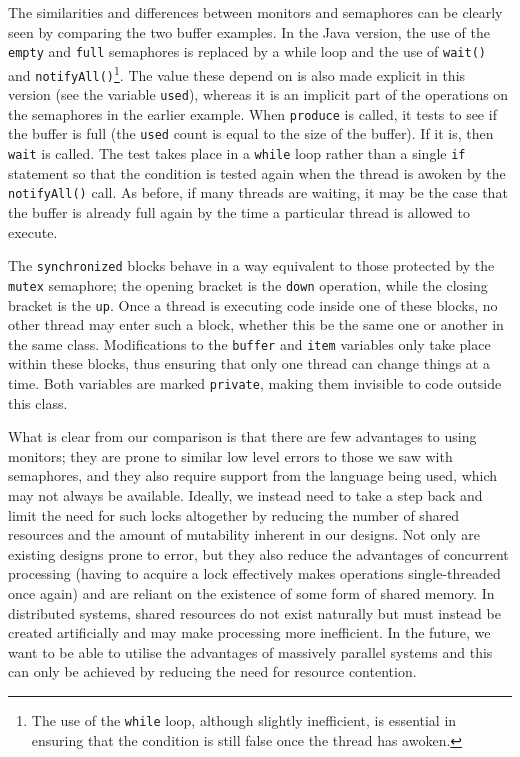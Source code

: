 The similarities and differences between monitors and semaphores can
be clearly seen by comparing the two buffer examples.  In the Java
version, the use of the \texttt{empty} and \texttt{full} semaphores is
replaced by a while loop and the use of \texttt{wait()} and
\texttt{notifyAll()}\footnote{The use of the \texttt{while} loop,
although slightly inefficient, is essential in ensuring that the
condition is still false once the thread has awoken.}.  The value
these depend on is also made explicit in this version (see the
variable \texttt{used}), whereas it is an implicit part of the
operations on the semaphores in the earlier example.  When
\texttt{produce} is called, it tests to see if the buffer is full (the
\texttt{used} count is equal to the size of the buffer).  If it is,
then \texttt{wait} is called.  The test takes place in a
\texttt{while} loop rather than a single \texttt{if} statement so that
the condition is tested again when the thread is awoken by the
\texttt{notifyAll()} call.  As before, if many threads are waiting, it
may be the case that the buffer is already full again by the time a
particular thread is allowed to execute.

The \texttt{synchronized} blocks behave in a way equivalent to those
protected by the \texttt{mutex} semaphore; the opening bracket is the
\texttt{down} operation, while the closing bracket is the \texttt{up}.
Once a thread is executing code inside one of these blocks, no other
thread may enter such a block, whether this be the same one or another
in the same class.  Modifications to the \texttt{buffer} and
\texttt{item} variables only take place within these blocks, thus
ensuring that only one thread can change things at a time.  Both
variables are marked \texttt{private}, making them invisible to code
outside this class.

What is clear from our comparison is that there are few advantages to
using monitors; they are prone to similar low level errors to those we
saw with semaphores, and they also require support from the language
being used, which may not always be available.  Ideally, we instead
need to take a step back and limit the need for such locks altogether
by reducing the number of shared resources and the amount of
mutability inherent in our designs.  Not only are existing designs
prone to error, but they also reduce the advantages of concurrent
processing (having to acquire a lock effectively makes operations
single-threaded once again) and are reliant on the existence of some
form of shared memory.  In distributed systems, shared resources do
not exist naturally but must instead be created artificially and may
make processing more inefficient.  In the future, we want to be able
to utilise the advantages of massively parallel systems and this can
only be achieved by reducing the need for resource contention.

